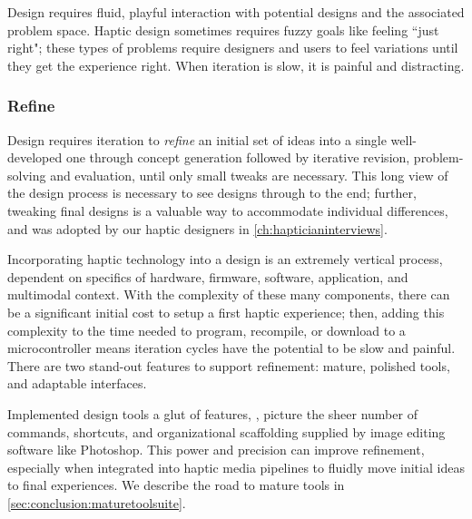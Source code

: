 Design requires fluid, playful interaction with potential designs and the associated problem space.
Haptic design sometimes requires fuzzy goals like feeling ``just right"; these types of problems require designers and users to feel variations until they get the experience right.
When iteration is slow, it is painful and distracting.


%
%
\subsubsection{Refine}
Design requires iteration to \emph{refine} an initial set of ideas into a single well-developed one through concept generation followed by iterative revision, problem-solving and  evaluation, until only small tweaks are necessary.
This long view of the design process is necessary to see designs through to the end;
further, tweaking final designs is a valuable way to accommodate individual differences, and was adopted by our haptic designers in \autoref{ch:hapticianinterviews}.

Incorporating haptic technology into a design is an extremely vertical process,  dependent on  specifics of hardware, firmware, software, application, and multimodal context.
With the complexity of these many components, there can be a significant initial cost to setup a first haptic experience; then, adding this complexity to the time needed to program, recompile, or download to a microcontroller means iteration cycles have the potential to be slow and painful. 
There are two stand-out features to support refinement: mature, polished tools, and adaptable interfaces.
%

Implemented design tools a glut of features, \eg, picture the sheer number of commands, shortcuts, and organizational scaffolding supplied by image editing software like Photoshop.
This power and precision can improve refinement, especially when integrated into haptic media pipelines to fluidly move initial ideas to final experiences. 
We describe the road to mature tools in \autoref{sec:conclusion:maturetoolsuite}.


